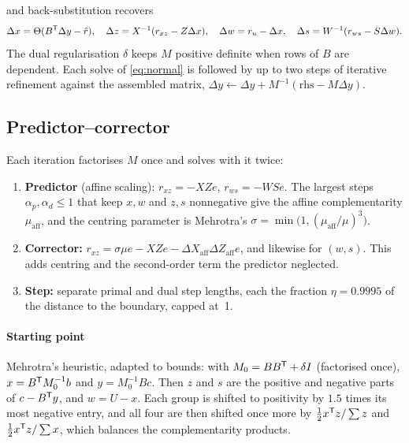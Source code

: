 and back-substitution recovers
\begin{equation}\label{eq:backsub}
  \Delta x = \Theta(B^{\mathsf{T}}\Delta y-\hat r),\quad
  \Delta z = X^{-1}(r_{xz}-Z\Delta x),\quad
  \Delta w = r_u-\Delta x,\quad
  \Delta s = W^{-1}(r_{ws}-S\Delta w).
\end{equation}
The dual regularisation $\delta$ keeps $M$ positive definite when rows of $B$ are dependent. Each
solve of \eqref{eq:normal} is followed by up to two steps of iterative refinement against the
assembled matrix, $\Delta y\leftarrow\Delta y + M^{-1}(\text{rhs}-M\Delta y)$.

\subsection{Predictor--corrector}
Each iteration factorises $M$ once and solves with it twice:
\begin{enumerate}
  \item \textbf{Predictor} (affine scaling): $r_{xz}=-XZe$, $r_{ws}=-WSe$. The largest steps
        $\alpha_p,\alpha_d\le1$ that keep $x,w$ and $z,s$ nonnegative give the affine
        complementarity $\mu_{\text{aff}}$, and the centring parameter is Mehrotra's
        $\sigma=\min\bigl(1,(\mu_{\text{aff}}/\mu)^3\bigr)$.
  \item \textbf{Corrector:} $r_{xz}=\sigma\mu e - XZe - \Delta X_{\text{aff}}\Delta Z_{\text{aff}}e$,
        and likewise for $(w,s)$. This adds centring and the second-order term the predictor
        neglected.
  \item \textbf{Step:} separate primal and dual step lengths, each the fraction $\eta=0.9995$ of the
        distance to the boundary, capped at~1.
\end{enumerate}

\paragraph{Starting point}
Mehrotra's heuristic, adapted to bounds: with $M_0=BB^{\mathsf{T}}+\delta I$ (factorised once),
$x=B^{\mathsf{T}} M_0^{-1}b$ and $y=M_0^{-1}Bc$. Then $z$ and $s$ are the positive and negative parts of
$c-B^{\mathsf{T}} y$, and $w = U-x$. Each group is shifted to positivity by $1.5$ times its most negative entry,
and all four are then shifted once more by $\frac12 x^{\mathsf{T}} z/\sum z$ and $\frac12 x^{\mathsf{T}} z/\sum x$, which
balances the complementarity products.

